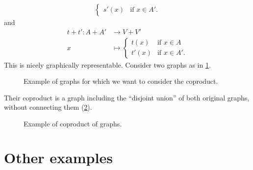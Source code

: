 \begin{example}
\begin{equation*}
\begin{aligned}
\begin{cases}
                s'(x)&\text{if } x\in A'.
            \end{cases}
        \end{aligned}
    \end{equation*}
    and
    \begin{equation*}
        \begin{aligned}
            t+t'\colon A+ A'&\to V+ V'\\
            x&\mapsto
            \begin{cases}
                t(x)& \text{if } x\in A\\
                t'(x)&\text{if } x\in A'.
            \end{cases}
        \end{aligned}
    \end{equation*}
    This is nicely graphically representable. Consider two graphs as in \cref{fig:graphs_1}.

    \begin{figure}[h!]
        \centering
        \caption{Example of graphs for which we want to consider the coproduct. \label{fig:graphs_1}}
    \end{figure}

    Their coproduct is a graph including the ``disjoint union'' of both original graphs, without connecting them (\cref{fig:graphs_2}).



    \begin{figure}[h!]
        \centering
        \caption{Example of coproduct of graphs. \label{fig:graphs_2}}
    \end{figure}

\end{example}


\section{Other examples}

